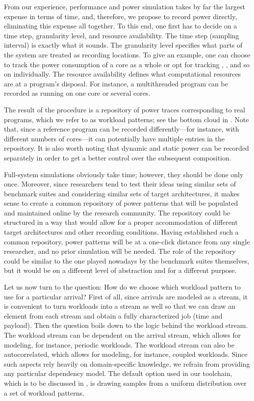 From our experience, performance and power simulation takes by far the largest
expense in terms of time, and, therefore, we propose to record power directly,
eliminating this expense all together. To this end, one first has to decide on a
time step, granularity level, and resource availability. The time step (sampling
interval) is exactly what it sounds. The granularity level specifies what parts
of the system are treated as recording locations. To give an example, one can
choose to track the power consumption of a core as a whole or opt for tracking
, , and so on individually. The resource availability defines
what computational resources are at a program's disposal. For instance, a
multithreaded program can be recorded as running on one core or several cores.

The result of the procedure is a repository of power traces corresponding to
real programs, which we refer to as workload patterns; see the bottom cloud in
. Note that, since a reference program can be recorded
differently---for instance, with different numbers of cores---it can potentially
have multiple entries in the repository. It is also worth noting that dynamic
and static power can be recorded separately in order to get a better control
over the subsequent composition.

Full-system simulations obviously take time; however, they should be done only
once. Moreover, since researchers tend to test their ideas using similar sets of
benchmark suites and considering similar sets of target architectures, it makes
sense to create a common repository of power patterns that will be populated and
maintained online by the research community. The repository could be structured
in a way that would allow for a proper accommodation of different target
architectures and other recording conditions. Having established such a common
repository, power patterns will be at a one-click distance from any single
researcher, and no prior simulation will be needed. The role of the repository
could be similar to the one played nowadays by the benchmark suites themselves,
but it would be on a different level of abstraction and for a different purpose.

Let us now turn to the question: How do we choose which workload pattern to use
for a particular arrival? First of all, since arrivals are modeled as a stream,
it is convenient to turn workloads into a stream as well so that we can draw an
element from each stream and obtain a fully characterized job (time and
payload). Then the question boils down to the logic behind the workload stream.
The workload stream can be dependent on the arrival stream, which allows for
modeling, for instance, periodic workloads. The workload stream can also be
autocorrelated, which allows for modeling, for instance, coupled workloads.
Since such aspects rely heavily on domain-specific knowledge, we refrain from
providing any particular dependency model. The default option used in our
toolchain, which is to be discussed in , is drawing samples from
a uniform distribution over a set of workload patterns.

